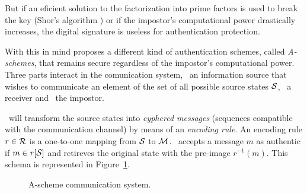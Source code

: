 \documentclass[conference]{IEEEtran}
\begin{document}
But if an eficient solution to the factorization into prime factors is used to break the key (Shor's algorithm \cite{b1}) or if the impostor's computational power drastically increases, the digital signature is useless for authentication protection.

With this in mind \cite{b2} proposes a different kind of authentication schemes, called \textit{A-schemes}, that remains secure regardless of the impostor's computational power. Three parts interact in the comunication system, \A\ an information source that wishes to communicate an element of the set of all possible source states $\mathcal S$, \B\ a receiver and \E\ the impostor.

\A\ will transform the source states into \textit{cyphered messages} (sequences compatible with the communication channel) by means of an \textit{encoding rule}. An encoding rule $r\in\mathcal R$ is a one-to-one mapping from $\mathcal S$ to $\mathcal M$. \B\ accepts a message $m$ as authentic if $m\in r[\mathcal S]$ and retireves the original state with the pre-image $r^{-1}(m)$. This schema is represented in Figure~\ref{figModelo3Participantes}.

\begin{figure}
    \centering
    \caption{A-scheme communication system.}
    \label{figModelo3Participantes}
\end{figure}
\end{document}
